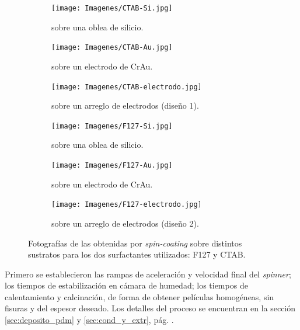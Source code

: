 			\begin{figure}[hb!]
	 	   	    \begin{subfigure}[t]{0.325\textwidth}
		        	\texttt{[image: Imagenes/CTAB-Si.jpg]}
		       		\caption{\pdmC\space sobre una oblea de silicio.}
		         	\label{fig:F127_vidrio}
		     		\end{subfigure}
	     		\begin{subfigure}[t]{0.325\textwidth}
		        	\texttt{[image: Imagenes/CTAB-Au.jpg]}
		       		\caption{\pdmC\space sobre un electrodo de Cr\textbar Au.}
		         	\label{fig:F127_silicio}
		     		\end{subfigure}
	     		\begin{subfigure}[t]{0.325\textwidth}
		        	\texttt{[image: Imagenes/CTAB-electrodo.jpg]}
		       		\caption{\pdmC\space sobre un arreglo de electrodos (diseño 1).}
		         	\label{fig:F127_Au}
		     		\end{subfigure}
	 	   	    \begin{subfigure}[t]{0.325\textwidth}
		        	\texttt{[image: Imagenes/F127-Si.jpg]}
		       		\caption{\pdmF\space sobre una oblea de silicio.}
		         	\label{fig:CTAB_vidrio}
		     		\end{subfigure}
	     		\begin{subfigure}[t]{0.325\textwidth}
		        	\texttt{[image: Imagenes/F127-Au.jpg]}
		       		\caption{\pdmF\space sobre un electrodo de Cr\textbar Au.}
		         	\label{fig:CTAB_silicio}
		     		\end{subfigure}
	     		\begin{subfigure}[t]{0.325\textwidth}
		        	\texttt{[image: Imagenes/F127-electrodo.jpg]}
		       		\caption{\pdmF\space sobre un arreglo de electrodos (diseño 2).}
		         	\label{fig:CTAB_Au}
		     		\end{subfigure}
	     		\caption[Películas mesoporosas sobre distintos soportes.]{Fotografías de las \pdm\space obtenidas por \textit{spin-coating }sobre distintos sustratos para los dos surfactantes utilizados: F127 y CTAB.}
	     		\label{fig:fotos_films}
	     	   	\end{figure}

		 Primero se establecieron las rampas de aceleración y velocidad final del \textit{spinner}; los tiempos de estabilización en cámara de humedad; los tiempos de calentamiento y calcinación, de forma de obtener películas homogéneas, sin fisuras y del espesor deseado. Los detalles del proceso se encuentran en la sección \ref{sec:deposito_pdm} y \ref{sec:cond_y_extr}, pág. \pageref{sec:deposito_pdm}. 

